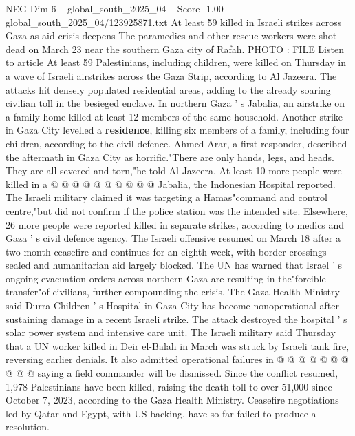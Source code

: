 \begin{textsample}{NEG Dim 6 – global\_south\_2025\_04 – Score -1.00 – global\_south\_2025\_04/123925871.txt}  \label{ex:f6_neg_170}
At least 59 killed in Israeli strikes across Gaza as aid crisis deepens The paramedics and other rescue workers were shot dead on March 23 near the southern Gaza city of Rafah.
PHOTO : FILE Listen to article At least 59 Palestinians, including children, were killed on Thursday in a wave of Israeli airstrikes across the Gaza Strip, according to Al Jazeera.
The attacks hit densely populated residential areas, adding to the already soaring civilian toll in the besieged enclave.
In northern Gaza ' s Jabalia, an airstrike on a family home killed at least 12 members of the same household.
Another strike in Gaza City levelled a \textbf{residence}, killing six members of a family, including four children, according to the civil defence.
Ahmed Arar, a first responder, described the aftermath in Gaza City as horrific."There are only hands, legs, and heads.
They are all severed and torn,"he told Al Jazeera.
At least 10 more people were killed in a @ @ @ @ @ @ @ @ @ @ Jabalia, the Indonesian Hospital reported.
The Israeli military claimed it was targeting a Hamas"command and control centre,"but did not confirm if the police station was the intended site.
Elsewhere, 26 more people were reported killed in separate strikes, according to medics and Gaza ' s civil defence agency.
The Israeli offensive resumed on March 18 after a two-month ceasefire and continues for an eighth week, with border crossings sealed and humanitarian aid largely blocked.
The UN has warned that Israel ' s ongoing evacuation orders across northern Gaza are resulting in the"forcible transfer"of civilians, further compounding the crisis.
The Gaza Health Ministry said Durra Children ' s Hospital in Gaza City has become nonoperational after sustaining damage in a recent Israeli strike.
The attack destroyed the hospital ' s solar power system and intensive care unit.
The Israeli military said Thursday that a UN worker killed in Deir el-Balah in March was struck by Israeli tank fire, reversing earlier denials.
It also admitted operational failures in @ @ @ @ @ @ @ @ @ @ saying a field commander will be dismissed.
Since the conflict resumed, 1,978 Palestinians have been killed, raising the death toll to over 51,000 since October 7, 2023, according to the Gaza Health Ministry.
Ceasefire negotiations led by Qatar and Egypt, with US backing, have so far failed to produce a resolution.

\end{textsample}

